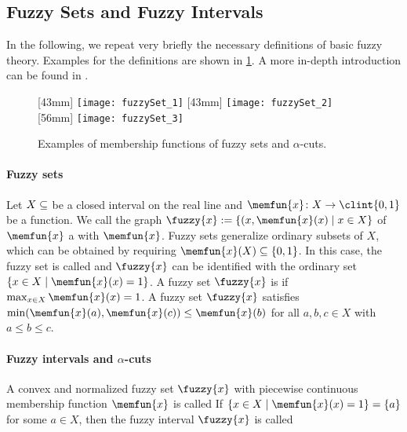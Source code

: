 \subsection{Fuzzy Sets and Fuzzy Intervals}
\label{sec:541fuzzySets}

In the following, we repeat very briefly the necessary
definitions of basic fuzzy theory.
Examples for the definitions are shown in \cref{fig:fuzzySet}.
A more in-depth introduction can be found in
.

\begin{figure}
  [43mm]{%
    \texttt{[image: fuzzySet\_1]}%
  }%
  \hfill%
  [43mm]{%
    \texttt{[image: fuzzySet\_2]}%
  }%
  \hfill%
  [56mm]{%
    \texttt{[image: fuzzySet\_3]}%
  }%
  \caption[%
    Examples of fuzzy sets and $\alpha$-cuts%
  ]{%
    Examples of membership functions of fuzzy sets and $\alpha$-cuts.%
  }%
  \label{fig:fuzzySet}%
\end{figure}

\paragraph{Fuzzy sets}

Let $X \subset \real$ be a closed interval on the real line
and $\memfun{x}\colon X \to \clint{0, 1}$ be a function.
We call the graph $\fuzzy{x} := \{(x, \memfun{x}(x) \mid x \in X\}$
of $\memfun{x}$ a  with
 $\memfun{x}$.
Fuzzy sets generalize ordinary subsets of $X$,
which can be obtained by requiring $\memfun{x}(X) \subset \{0, 1\}$.
In this case, the fuzzy set is called  and
$\fuzzy{x}$ can be identified with the ordinary set
$\{x \in X \mid \memfun{x}(x) = 1\}$.
A fuzzy set $\fuzzy{x}$ is 
if $\max_{x \in X} \memfun{x}(x) = 1$.
A  fuzzy set $\fuzzy{x}$ satisfies
$\min(\memfun{x}(a), \memfun{x}(c)) \le \memfun{x}(b)$ for all $a, b, c \in X$
with $a \le b \le c$.

\paragraph{Fuzzy intervals and $\alpha$-cuts}

A convex and normalized fuzzy set $\fuzzy{x}$ with
piecewise continuous membership function $\memfun{x}$ is called
If $\{x \in X \mid \memfun{x}(x) = 1\} = \{a\}$ for some $a \in X$,
then the fuzzy interval $\fuzzy{x}$ is called 

